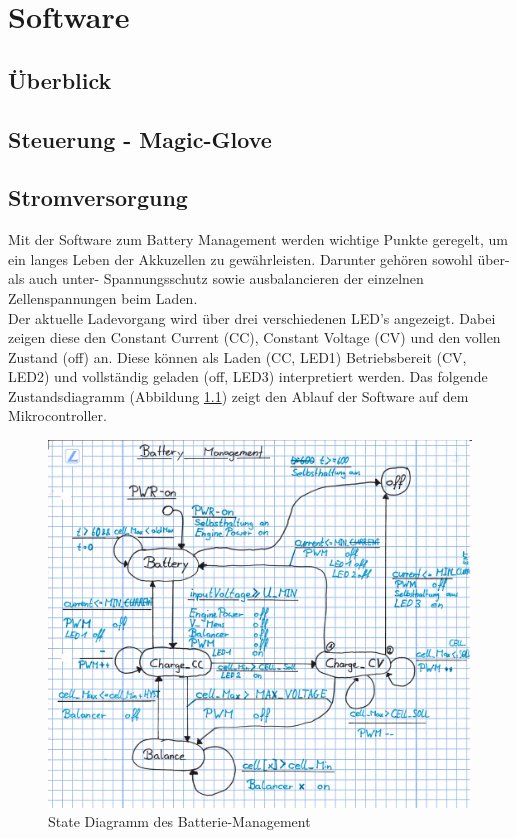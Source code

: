 \chapter{Software} \label{Software}
\section{Überblick}
\section{Steuerung - Magic-Glove} \label{SW_MagicGlove}
\section{Stromversorgung} \label{SW_Stromversorgung}
Mit der Software zum Battery Management werden wichtige Punkte geregelt, um ein langes Leben der Akkuzellen zu gewährleisten. Darunter gehören sowohl über- als auch unter- Spannungsschutz sowie ausbalancieren der einzelnen Zellenspannungen beim Laden. \\
Der aktuelle Ladevorgang wird über drei verschiedenen LED’s angezeigt. Dabei zeigen diese den Constant Current (CC), Constant Voltage (CV) und den vollen Zustand (off) an. Diese können als Laden (CC, LED1) Betriebsbereit (CV, LED2) und vollständig geladen (off, LED3) interpretiert werden. 
Das folgende Zustandsdiagramm (Abbildung \ref{fig:statediagrammbatterie}) zeigt den Ablauf der Software auf dem Mikrocontroller.
\begin{figure} [H]
	\centering
	\includegraphics[width=1\linewidth]{images/Statediagramm_Batterie}
	\caption{State Diagramm des Batterie-Management}
	\label{fig:statediagrammbatterie}
\end{figure}

